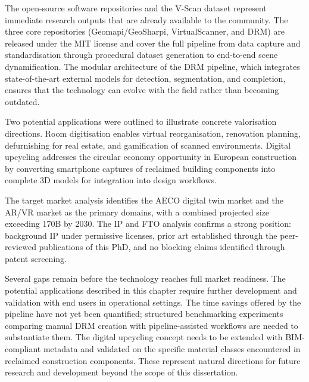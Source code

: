 The open-source software repositories and the V-Scan dataset represent immediate research outputs that are already available to the community. The three core repositories (Geomapi/GeoSharpi, VirtualScanner, and DRM) are released under the MIT license and cover the full pipeline from data capture and standardisation through procedural dataset generation to end-to-end scene dynamification. The modular architecture of the DRM pipeline, which integrates state-of-the-art external models for detection, segmentation, and completion, ensures that the technology can evolve with the field rather than becoming outdated.

Two potential applications were outlined to illustrate concrete valorisation directions. Room digitisation enables virtual reorganisation, renovation planning, defurnishing for real estate, and gamification of scanned environments. Digital upcycling addresses the circular economy opportunity in European construction by converting smartphone captures of reclaimed building components into complete 3D models for integration into design workflows.

The target market analysis identifies the AECO digital twin market and the AR/VR market as the primary domains, with a combined projected size exceeding \texteuro170B by 2030. The IP and FTO analysis confirms a strong position: background IP under permissive licenses, prior art established through the peer-reviewed publications of this PhD, and no blocking claims identified through patent screening.

Several gaps remain before the technology reaches full market readiness. The potential applications described in this chapter require further development and validation with end users in operational settings. The time savings offered by the pipeline have not yet been quantified; structured benchmarking experiments comparing manual DRM creation with pipeline-assisted workflows are needed to substantiate them. The digital upcycling concept needs to be extended with BIM-compliant metadata and validated on the specific material classes encountered in reclaimed construction components. These represent natural directions for future research and development beyond the scope of this dissertation.

\cleardoublepage

